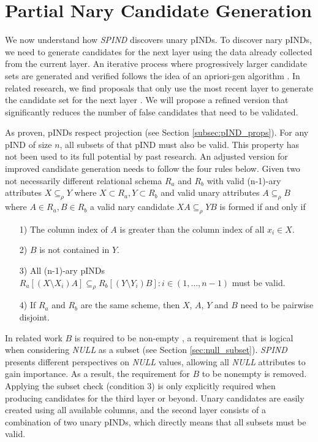 \section{Partial Nary Candidate Generation}\label{sec:candidate_gen}
We now understand how \textit{SPIND} discovers unary pINDs. To discover nary pINDs, we need to generate candidates for the next layer using the data already collected from the current layer. An iterative process where progressively larger candidate sets are generated and verified follows the idea of an apriori-gen algorithm \cite{agrawal1994fast}. In related research, we find proposals that only use the most recent layer to generate the candidate set for the next layer \cite{papenbrock2015divide}. We will propose a refined version that significantly reduces the number of false candidates that need to be validated.

As proven, pINDs respect projection (see Section \ref{subsec:pIND_props}). For any pIND of size $n$, all subsets of that pIND must also be valid. This property has not been used to its full potential by past research. An adjusted version for improved candidate generation needs to follow the four rules below. Given two not necessarily different relational schema $R_a$ and $R_b$ with valid (n-1)-ary attributes $X \subseteq_\rho Y$ where $X \subset R_a, Y \subset R_b$ and valid unary attributes $A \subseteq_\rho B$ where $A \in R_a, B \in R_b$ a valid nary candidate $XA \subseteq_\rho YB$ is formed if and only if
\begin{itemize}
    \item[1)] The column index of $A$ is greater than the column index of all $x_i \in X$.
    \item[2)] $B$ is not contained in $Y$.
    \item[3)] All (n-1)-ary pINDs $R_a[(X \setminus X_i)A] \subseteq_\rho R_b[(Y \setminus Y_i)B] : i \in (1, \dots, n-1)$ must be valid.
    \item[4)] If $R_a$ and $R_b$ are the same scheme, then $X$, $A$, $Y$ and $B$ need to be pairwise disjoint.
\end{itemize}

In related work $B$ is required to be non-empty \cite{papenbrock2015divide}, a requirement that is logical when considering \textit{NULL} as a subset (see Section \ref{sec:null_subset}). \textit{SPIND} presents different perspectives on \textit{NULL} values, allowing all \textit{NULL} attributes to gain importance. As a result, the requirement for $B$ to be nonempty is removed. Applying the subset check (condition 3) is only explicitly required when producing candidates for the third layer or beyond. Unary candidates are easily created using all available columns, and the second layer consists of a combination of two unary pINDs, which directly means that all subsets must be valid.

